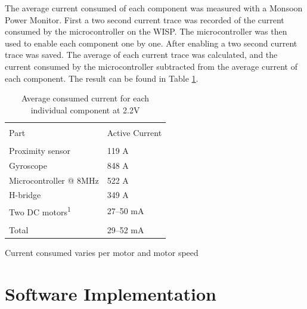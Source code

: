 The average current consumed of each component was measured with a Monsoon Power Monitor.
First a two second current trace was recorded of the current consumed by the microcontroller on the WISP.
The microcontroller was then used to enable each component one by one.
After enabling a two second current trace was saved.
The average of each current trace was calculated, and the current consumed by the microcontroller subtracted from the average current of each component.
The result can be found in Table \ref{tab:avg_cur_comp}.


\begin{table}[t]
	\centering
	\begin{threeparttable}
		\caption{Average consumed current for each individual component at 2.2V}
		\label{tab:avg_cur_comp}
		\begin{tabularx}{0.7\textwidth}{l@{\hskip 0.6in}l} 
			\hline
			\\[-1em]
			Part & Active Current \\
			\hline\hline
			\\[-1em]
			Proximity sensor & 119 \textmu A \\
			Gyroscope & 848 \textmu A\\	
			Microcontroller @ 8MHz & 522 \textmu A\\
			H-bridge & 349 \textmu A \\
			Two DC motors\textsuperscript{1} & 27--50 mA  \\
			\hline
			\\[-1em]
			Total & 29--52 mA \\
			\hline
		\end{tabularx}
		\begin{tablenotes}
		\small
		\item [1] Current consumed varies per motor and motor speed
		\end{tablenotes}
	\end{threeparttable}
\end{table}


\section{Software Implementation}



